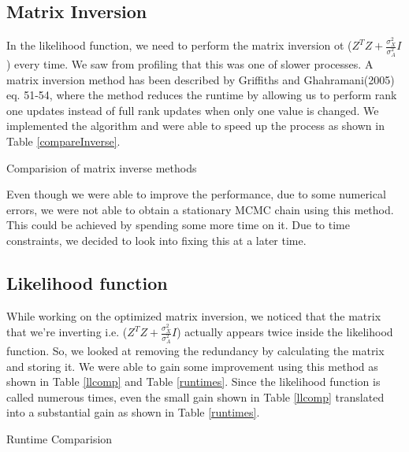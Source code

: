 \documentclass{article}
\begin{document}

\subsection{Matrix Inversion}
In the likelihood function, we need to perform the matrix inversion ot ($Z^TZ+\frac{\sigma_X^2}{\sigma_A^2}I$) every time. We saw from profiling that this was one of slower processes. A matrix inversion method has been described by Griffiths and Ghahramani(2005)~\cite{griffiths1} eq. 51-54, where the method reduces the runtime by allowing us to perform rank one updates instead of full rank updates when only one value is changed. We implemented the algorithm and were able to speed up the process as shown in Table \ref{compareInverse}.

\begin{table}[ht]
\centering
\caption{Comparision of matrix inverse methods \label{compareInverse}}

\end{table}

Even though we were able to improve the performance, due to some numerical errors, we were not able to obtain a stationary MCMC chain using this method. This could be achieved by spending some more time on it. Due to time constraints, we decided to look into fixing this at a later time.\\

\subsection{Likelihood function}
While working on the optimized matrix inversion, we noticed that the matrix that we're inverting i.e. ($Z^TZ+\frac{\sigma_X^2}{\sigma_A^2}I$) actually appears twice inside the likelihood function. So, we looked at removing the redundancy by calculating the matrix and storing it. We were able to gain some improvement using this method as shown in Table \ref{llcomp} and Table \ref{runtimes}. Since the likelihood function is called numerous times, even the small gain shown in Table \ref{llcomp} translated into a substantial gain as shown in Table \ref{runtimes}.\\


\begin{table}[ht]
\centering
\caption{Runtime Comparision \label{llcomp}}


\end{table}
\end{document}
